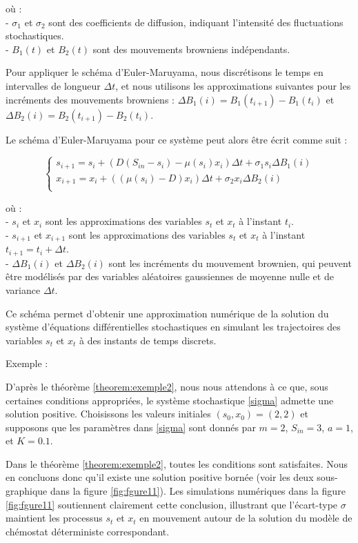 \documentclass[12pt,a4paper]{report}%
\newcounter{PP}[chapter]
\newenvironment{exemple}[2][]
  {\refstepcounter{PP}
  \begin{bclogo}[
    logo=\bccrayon , %
    couleur=white,
    arrondi=0.1,
    barre =snake,
     tailleOndu = 1.5,
    couleurBord=white,#1]{Exemple \thePP:#2}
  }
  {\end{bclogo}}
\begin{document}
où :\\
- \(\sigma_1\) et \(\sigma_2\) sont des coefficients de diffusion, indiquant l'intensité des fluctuations stochastiques.\\
- \(B_1(t)\) et \(B_2(t)\) sont des mouvements browniens indépendants.

Pour appliquer le schéma d'Euler-Maruyama, nous discrétisons le temps en intervalles de longueur \(\Delta t\), et nous utilisons les approximations suivantes pour les incréments des mouvements browniens : \(\Delta B_1(i) = B_1(t_{i+1}) - B_1(t_i)\) et \(\Delta B_2(i) = B_2(t_{i+1}) - B_2(t_i)\).

Le schéma d'Euler-Maruyama pour ce système peut alors être écrit comme suit :

\[
\begin{cases}
	s_{i+1} = s_i + \left( D \left(S_{in} - s_i\right) - \mu(s_i)x_i \right) \Delta t + \sigma_1 s_i \Delta B_1(i) \\
	x_{i+1} = x_i + \left( (\mu(s_i) - D) x_i \right) \Delta t + \sigma_2 x_i \Delta B_2(i) \\
\end{cases}
\]

où :\\
- \(s_i\) et \(x_i\) sont les approximations des variables \(s_t\) et \(x_t\) à l'instant \(t_i\).\\
- \(s_{i+1}\) et \(x_{i+1}\) sont les approximations des variables \(s_t\) et \(x_t\) à l'instant \(t_{i+1} = t_i + \Delta t\).\\
- \(\Delta B_1(i)\) et \(\Delta B_2(i)\) sont les incréments du mouvement brownien, qui peuvent être modélisés par des variables aléatoires gaussiennes de moyenne nulle et de variance \(\Delta t\).

Ce schéma permet d'obtenir une approximation numérique de la solution du système d'équations différentielles stochastiques en simulant les trajectoires des variables \(s_t\) et \(x_t\) à des instants de temps discrets.
\begin{exemple}{}
	D’après le théorème \ref{theorem:exemple2}, nous nous attendons à ce que, sous certaines conditions appropriées, le système stochastique \eqref{sigma} admette une solution positive. Choisissons les valeurs initiales \((s_0, x_0) = (2, 2)\) et supposons que les paramètres dans \eqref{sigma} sont donnés par \(m = 2\), \(S_{in} = 3\), \(a = 1\), et \(K = 0.1\).
	
	Dans le théorème \ref{theorem:exemple2}, toutes les conditions sont satisfaites. Nous en concluons donc qu’il existe une solution positive bornée (voir les deux sous-graphique dans la figure \ref{fig:fgure11}). Les simulations numériques dans la figure \ref{fig:fgure11} soutiennent clairement cette conclusion, illustrant que l’écart-type \(\sigma\) maintient les processus \(s_t\) et \(x_t\) en mouvement autour de la solution du modèle de chémostat déterministe correspondant.
	
	
\end{exemple}
\end{document}
